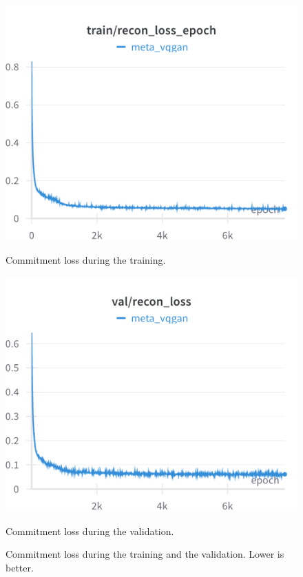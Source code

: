 \begin{figure}[H]
\includegraphics[width=\linewidth]{detailed_engineering/Meta VQGAN/charts/Section-2-Panel-13-1qhe42yar.png}
\caption{Commitment loss during the training.}
\endminipage\hfill
{}
\includegraphics[width=\linewidth]{detailed_engineering/Meta VQGAN/charts/Section-4-Panel-3-hkj1c12xb.png}
\caption{Commitment loss during the validation.}
\endminipage
\caption{Commitment loss during the training and the validation. Lower is better.}
\end{figure}

